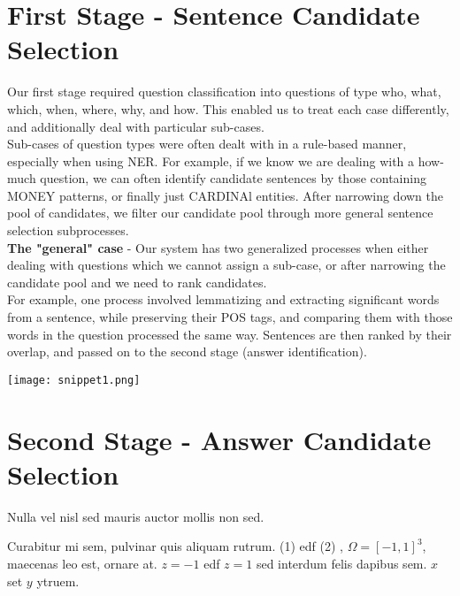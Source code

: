 \documentclass[a1,landscape]{a0poster}
\begin{document}
\begin{multicols}{3}

\section*{\large First Stage - Sentence Candidate Selection}
Our first stage required question classification into questions of type who, what, which, when, where, why, and how. This enabled us to treat each case differently, and additionally deal with particular sub-cases. \\
Sub-cases of question types were often dealt with in a rule-based manner, especially when using NER. For example, if we know we are dealing with a how-much question, we can often identify candidate sentences by those containing MONEY patterns, or finally just CARDINAl entities. After narrowing down the pool of candidates, we filter our candidate pool through more general sentence selection subprocesses. \\
\textbf{The "general" case} - Our system has two generalized processes when either dealing with questions which we cannot assign a sub-case, or after narrowing the candidate pool and we need to rank candidates.\\ For example, one process involved lemmatizing and extracting significant words from a sentence, while preserving their POS tags, and comparing them with those words in the question processed the same way. Sentences are then ranked by their overlap, and passed on to the second stage (answer identification).
\begin{center}\vspace{1cm}
\texttt{[image: snippet1.png]}
\end{center}\vspace{1cm}


\section*{\large Second Stage - Answer Candidate Selection}

Nulla vel nisl sed mauris auctor mollis non sed. 

Curabitur mi sem, pulvinar quis aliquam rutrum. (1) edf (2)
, $\Omega=[-1,1]^3$, maecenas leo est, ornare at. $z=-1$ edf $z=1$ sed interdum felis dapibus sem. $x$ set $y$ ytruem. 



\end{multicols}
\end{document}
